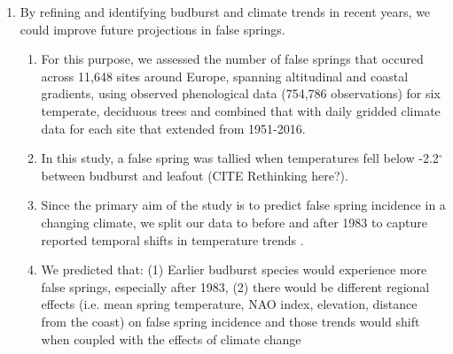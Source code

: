 \documentclass{article}\usepackage[]{graphicx}\usepackage[]{color}
\begin{document}
\begin{enumerate}
\item By refining and identifying budburst and climate trends in recent years, we could improve future projections in false springs. %
\begin{enumerate}
\item For this purpose, we assessed the number of false springs that occured across 11,648 sites around Europe, spanning altitudinal and coastal gradients, using observed phenological data (754,786 observations) for six temperate, deciduous trees and combined that with daily gridded climate data for each site that extended from 1951-2016. %
\item In this study, a false spring was tallied when temperatures fell below -2.2$^{\circ}$ \citep{Schwartz1993} between budburst and leafout (CITE Rethinking here?).
\item Since the primary aim of the study is to predict false spring incidence in a changing climate, we split our data to before and after 1983 to capture reported temporal shifts in temperature trends \citep{Stocker2013, Kharouba2018}.
\item We predicted that: (1) Earlier budburst species would experience more false springs, especially after 1983,  %
(2) there would be different regional effects (i.e. mean spring temperature, NAO index, elevation, distance from the coast) on false spring incidence and those trends would shift when coupled with the effects of climate change %

\end{enumerate}
\end{enumerate}
\end{document}
